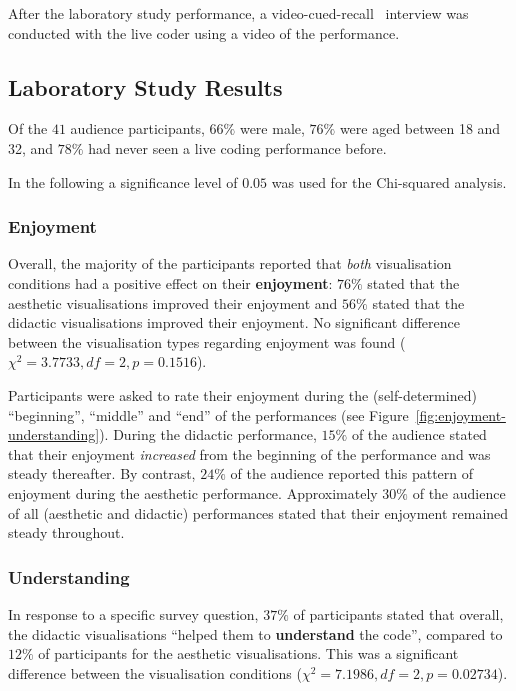 \documentclass{sig-alternate}
\begin{document}
After the laboratory study performance, a
video-cued-recall~\cite{Suchman:1992tk} interview was conducted with
the live coder using a video of the performance.

\subsection{Laboratory Study Results}

Of the $41$ audience participants, $66\%$ were male, $76\%$ were aged
between 18 and 32, and $78\%$ had never seen a live coding performance
before.

In the following a significance level of $0.05$ was used for the
Chi-squared analysis.

\subsubsection{Enjoyment}

Overall, the majority of the participants reported that \emph{both}
visualisation conditions had a positive effect on their
\textbf{enjoyment}: $76\%$ stated that the aesthetic visualisations
improved their enjoyment and $56\%$ stated that the didactic
visualisations improved their enjoyment. No significant difference
between the visualisation types regarding enjoyment was found
($\chi^2=3.7733,df=2,p=0.1516$).

Participants were asked to rate their enjoyment during the
(self-determined) ``beginning'', ``middle'' and ``end'' of the
performances (see Figure~\ref{fig:enjoyment-understanding}). During
the didactic performance, $15\%$ of the audience stated that their
enjoyment \emph{increased} from the beginning of the performance and
was steady thereafter. By contrast, $24\%$ of the audience reported
this pattern of enjoyment during the aesthetic performance.
Approximately $30\%$ of the audience of all (aesthetic and didactic)
performances stated that their enjoyment remained steady throughout.

\subsubsection{Understanding}

In response to a specific survey question, $37\%$ of participants
stated that overall, the didactic visualisations ``helped them to
\textbf{understand} the code'', compared to $12\%$ of participants for 
the aesthetic visualisations. This was a significant difference
between the visualisation conditions ($\chi^2=7.1986,df=2,p=0.02734$).
\end{document}
